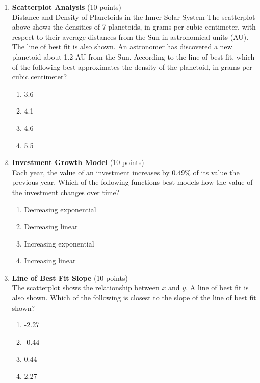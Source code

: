 \begin{enumerate}
  \newpage

  \item \textbf{Scatterplot Analysis} (10 points)\\
  Distance and Density of Planetoids in the Inner Solar System
  The scatterplot above shows the densities of 7 planetoids, in grams per cubic centimeter, with respect to their average distances from the Sun in astronomical units (AU). The line of best fit is also shown. An astronomer has discovered a new planetoid about 1.2 AU from the Sun. According to the line of best fit, which of the following best approximates the density of the planetoid, in grams per cubic centimeter?
  \begin{enumerate}[label=(\Alph*)]
    \item 3.6
    \item 4.1
    \item 4.6
    \item 5.5
  \end{enumerate}
  \begin{subanswer}
  \end{subanswer}

  \item \textbf{Investment Growth Model} (10 points)\\
  Each year, the value of an investment increases by $0.49\%$ of its value the previous year. Which of the following functions best models how the value of the investment changes over time?
  \begin{enumerate}[label=(\Alph*)]
    \item Decreasing exponential
    \item Decreasing linear
    \item Increasing exponential
    \item Increasing linear
  \end{enumerate}
  \begin{subanswer}
  \end{subanswer}

  \newpage

  \item \textbf{Line of Best Fit Slope} (10 points)\\
  The scatterplot shows the relationship between $x$ and $y$. A line of best fit is also shown.
  Which of the following is closest to the slope of the line of best fit shown?
  \begin{enumerate}[label=(\Alph*)]
    \item -2.27
    \item -0.44
    \item 0.44
    \item 2.27
  \end{enumerate}
  \begin{subanswer}
  \end{subanswer}


\end{enumerate}
